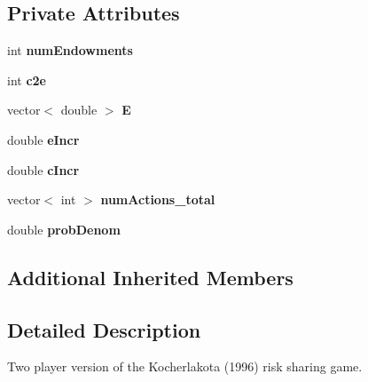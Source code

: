 \subsection*{Private Attributes}
\begin{DoxyCompactItemize}
\item 
\mbox{\label{classRiskSharingGame__3Player__Merged_a99abe786dd53923789d99e86791affd3}} 
int {\bfseries num\+Endowments}
\item 
\mbox{\label{classRiskSharingGame__3Player__Merged_a6e775a19ff8f5141b2e7b8575885401d}} 
int {\bfseries c2e}
\item 
\mbox{\label{classRiskSharingGame__3Player__Merged_acb4be7edf1f8e280748b8c1bd6992a10}} 
vector$<$ double $>$ {\bfseries E}
\item 
\mbox{\label{classRiskSharingGame__3Player__Merged_a0f2acb80b7834d796c61fb956934a91f}} 
double {\bfseries e\+Incr}
\item 
\mbox{\label{classRiskSharingGame__3Player__Merged_a711d6e50ccd05e36c01f961d2690abae}} 
double {\bfseries c\+Incr}
\item 
\mbox{\label{classRiskSharingGame__3Player__Merged_a98326dd60feff58d3fd575c96f99600d}} 
vector$<$ int $>$ {\bfseries num\+Actions\+\_\+total}
\item 
\mbox{\label{classRiskSharingGame__3Player__Merged_a979d06cb01dbb5a1babe63220961bf27}} 
double {\bfseries prob\+Denom}
\end{DoxyCompactItemize}
\subsection*{Additional Inherited Members}


\subsection{Detailed Description}
Two player version of the Kocherlakota (1996) risk sharing game. 

